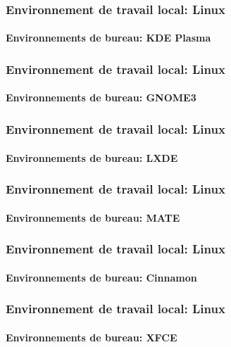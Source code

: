 \documentclass[xcolor=table]{beamer}
\begin{document}
\begin{frame}
\frametitle{Environnement de travail local: Linux}
\framesubtitle{Environnements de bureau: KDE Plasma}

\begin{center}
\end{center}

\end{frame}

\begin{frame}
\frametitle{Environnement de travail local: Linux}
\framesubtitle{Environnements de bureau: GNOME3}

\begin{center}
\end{center}

\end{frame}

\begin{frame}
\frametitle{Environnement de travail local: Linux}
\framesubtitle{Environnements de bureau: LXDE}

\begin{center}
\end{center}

\end{frame}

\begin{frame}
\frametitle{Environnement de travail local: Linux}
\framesubtitle{Environnements de bureau: MATE}

\begin{center}
\end{center}

\end{frame}


\begin{frame}
\frametitle{Environnement de travail local: Linux}
\framesubtitle{Environnements de bureau: Cinnamon}

\begin{center}
\end{center}

\end{frame}

\begin{frame}
\frametitle{Environnement de travail local: Linux}
\framesubtitle{Environnements de bureau: XFCE}

\begin{center}
\end{center}

\end{frame}
\end{document}
